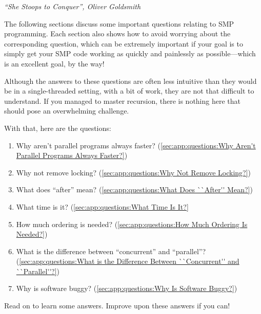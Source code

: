 
%
	 {\emph{``She Stoops to Conquer'', Oliver Goldsmith}}

The following sections discuss some important questions relating to
SMP programming.
Each section also shows how to avoid worrying about
the corresponding question, which can be extremely important if
your goal is to simply get your SMP code working as quickly and
painlessly as possible---which is an excellent goal, by the way!

Although the answers to these questions are often less
intuitive than they would be in a single-threaded setting,
with a bit of work, they are not that difficult to understand.
If you managed to master recursion, there is nothing here that should
pose an overwhelming challenge.

With that, here are the questions:

\begin{enumerate}
\item	Why aren't parallel programs always faster?
	(\cref{sec:app:questions:Why Aren't Parallel Programs Always Faster?})
\item	Why not remove locking?
	(\cref{sec:app:questions:Why Not Remove Locking?})
\item	What does ``after'' mean?
	(\cref{sec:app:questions:What Does ``After'' Mean?})
\item	What time is it?
	(\cref{sec:app:questions:What Time Is It?}
\item	How much ordering is needed?
	(\cref{sec:app:questions:How Much Ordering Is Needed?})
\item	What is the difference between ``concurrent'' and ``parallel''?
	(\cref{sec:app:questions:What is the Difference Between ``Concurrent'' and ``Parallel''?})
\item	Why is software buggy?
	(\cref{sec:app:questions:Why Is Software Buggy?})
\end{enumerate}

Read on to learn some answers.
Improve upon these answers if you can!









